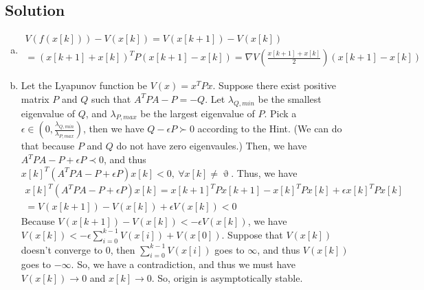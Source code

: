 \documentclass[11pt]{report}
\theoremstyle{definition}
\newcommand{\xlr}[2]{#1 \left(#2\right)}
\begin{document}
\subsection*{Solution}
\begin{enumerate}[(a), noitemsep]
\item
\begin{multline*}
\xlr{V}{\xlr{f}{x[k]}} - \xlr{V}{x[k]} = \xlr{V}{x[k+1]} - \xlr{V}{x[k]} \\= (x[k+1] + x[k])^T P (x[k+1] - x[k]) = \nabla \xlr{V}{\frac{x[k+1] + x[k]}{2}} (x[k+1] - x[k])
\end{multline*}
\item
Let the Lyapunov function be $V(x) = x^T P x$. Suppose there exist positive matrix $P$ and $Q$ such that $A^T P A - P = -Q$. Let $\lambda_{Q,min}$ be the smallest eigenvalue of $Q$, and $\lambda_{P,max}$ be the largest eigenvalue of $P$. Pick a $\epsilon \in (0, \frac{\lambda_{Q,min}}{\lambda_{P,max}})$, then we have $Q - \epsilon P \succ 0$ according to the Hint. (We can do that because $P$ and $Q$ do not have zero eigenvaules.) Then, we have $A^T P A - P + \epsilon P \prec 0$, and thus $x[k]^T(A^T P A - P + \epsilon P)x[k] < 0,~\forall x[k] \neq \upvartheta$. Thus, we have
\begin{multline}
x[k]^T(A^T P A - P + \epsilon P)x[k] = x[k+1]^T P x[k+1] - x[k]^T P x[k] + \epsilon x[k]^T P x[k]\\ = V(x[k+1]) - V(x[k]) + \epsilon V(x[k]) < 0
\end{multline}
Because $V(x[k+1]) - V(x[k]) < - \epsilon V(x[k])$, we have $V(x[k]) < -\epsilon \sum\limits_{i=0}^{k-1}V(x[i]) + V(x[0])$. Suppose that $V(x[k])$ doesn't converge to 0, then $\sum\limits_{i=0}^{k-1}V(x[i])$ goes to $\infty$, and thus $V(x[k])$ goes to $-\infty$. So, we have a contradiction, and thus we must have $V(x[k]) \to 0$ and $x[k] \to 0$. So, origin is asymptotically stable.



\end{enumerate}
\end{document}
